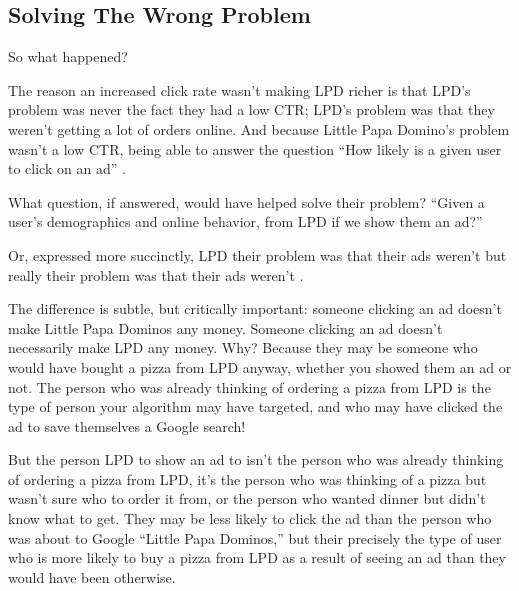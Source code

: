 \documentclass[letterpaper,10pt,english]{jupyterBook}
\begin{document}
\subsection{Solving The Wrong Problem}
\label{\detokenize{20_problems_to_questions/15_solving_the_wrong_problem:solving-the-wrong-problem}}
\sphinxAtStartPar
So what happened?

\sphinxAtStartPar
The reason an increased click rate wasn’t making LPD richer is that LPD’s problem was never the fact they had a low CTR; LPD’s  problem was that they weren’t getting a lot of orders online. And because Little Papa Domino’s problem wasn’t a low CTR, being able to answer the question “How likely is a given user to click on an ad” .

\sphinxAtStartPar
What question, if answered, would have helped solve their problem? “Given a user’s demographics and online behavior,  from LPD if we show them an ad?”

\sphinxAtStartPar
Or, expressed more succinctly, LPD  their problem was that their ads weren’t  but really their problem was that their ads weren’t .

\sphinxAtStartPar
The difference is subtle, but critically important: someone clicking an ad doesn’t make Little Papa Dominos any money. Someone clicking an ad  doesn’t necessarily make LPD any money. Why? Because they may be someone who would have bought a pizza from LPD anyway, whether you showed them an ad or not. The person who was already thinking of ordering a pizza from LPD is  the type of person your algorithm may have targeted, and who may have clicked the ad to save themselves a Google search!

\sphinxAtStartPar
But the person LPD  to show an ad to isn’t the person who was already thinking of ordering a pizza from LPD, it’s the person who was thinking of a pizza but wasn’t sure who to order it from, or the person who wanted dinner but didn’t know what to get. They may be less likely to click the ad than the person who was about to Google “Little Papa Dominos,” but their precisely the type of user who is more likely to buy a pizza from LPD as a result of seeing an ad than they would have been otherwise.
\end{document}
